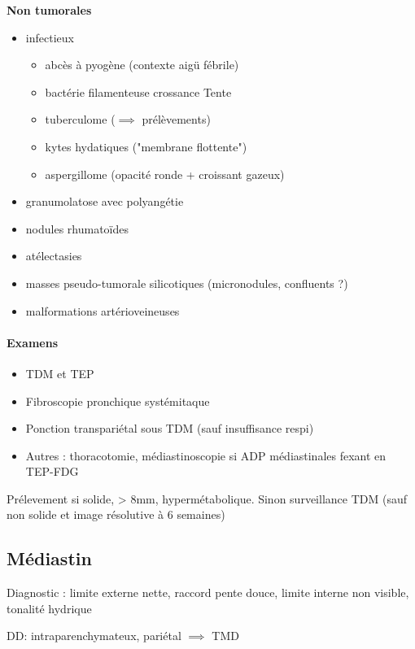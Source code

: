 \documentclass{article}
\begin{document}
\textbf{Non tumorales}
\begin{itemize}
  \item infectieux 
    \begin{itemize}
      \item abcès à pyogène (contexte aigü fébrile)
      \item bactérie filamenteuse crossance Tente
      \item tuberculome ($\implies$ prélèvements)
      \item kytes hydatiques ("membrane flottente")
      \item aspergillome (opacité ronde + croissant gazeux)
    \end{itemize}
  \item granumolatose avec polyangétie
  \item nodules rhumatoïdes
  \item atélectasies
  \item masses pseudo-tumorale silicotiques (micronodules, confluents ?)
  \item malformations artérioveineuses
\end{itemize}

\paragraph{Examens}
\begin{itemize}
  \item TDM et TEP
  \item Fibroscopie pronchique systémitaque
  \item Ponction transpariétal sous TDM (sauf insuffisance respi)
  \item Autres : thoracotomie, médiastinoscopie si ADP médiastinales fexant en TEP-FDG
\end{itemize}
Prélevement si solide, > 8mm, hypermétabolique. Sinon surveillance TDM (sauf non solide et image résolutive à 6 semaines)

\subsection{Médiastin}
Diagnostic : limite externe nette, raccord pente douce, limite interne non
visible, tonalité hydrique

DD: intraparenchymateux, pariétal $\implies$ TMD
\end{document}
